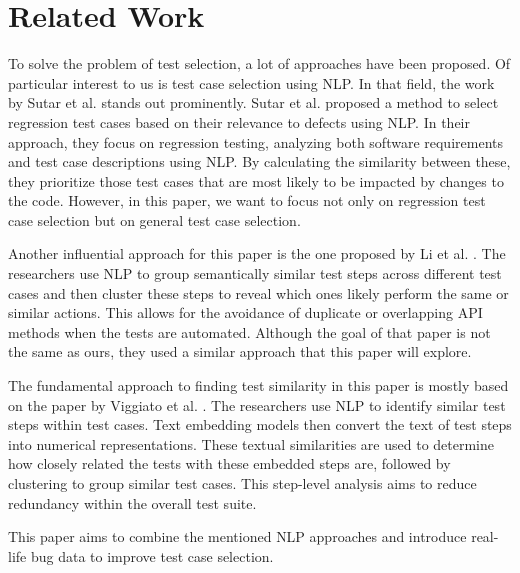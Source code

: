 \section{Related Work}

To solve the problem of test selection, a lot of approaches have been proposed. Of particular interest to us is test case selection using \ac{NLP}. In that field, the work by Sutar et al. \cite{Sutar} stands out prominently. Sutar et al. proposed a method to select regression test cases based on their relevance to defects using \ac{NLP}. In their approach, they focus on regression testing, analyzing both software requirements and test case descriptions using \ac{NLP}. By calculating the similarity between these, they prioritize those test cases that are most likely to be impacted by changes to the code. However, in this paper, we want to focus not only on regression test case selection but on general test case selection.

Another influential approach for this paper is the one proposed by Li et al. \cite{Li}. The researchers use \ac{NLP} to group semantically similar test steps across different test cases and then cluster these steps to reveal which ones likely perform the same or similar actions. This allows for the avoidance of duplicate or overlapping API methods when the tests are automated. Although the goal of that paper is not the same as ours, they used a similar approach that this paper will explore.

The fundamental approach to finding test similarity in this paper is mostly based on the paper by Viggiato et al. \cite{Viggiato}. The researchers use \ac{NLP} to identify similar test steps within test cases. Text embedding models then convert the text of test steps into numerical representations. These textual similarities are used to determine how closely related the tests with these embedded steps are, followed by clustering to group similar test cases. This step-level analysis aims to reduce redundancy within the overall test suite.

This paper aims to combine the mentioned \ac{NLP} approaches and introduce real-life bug data to improve test case selection.